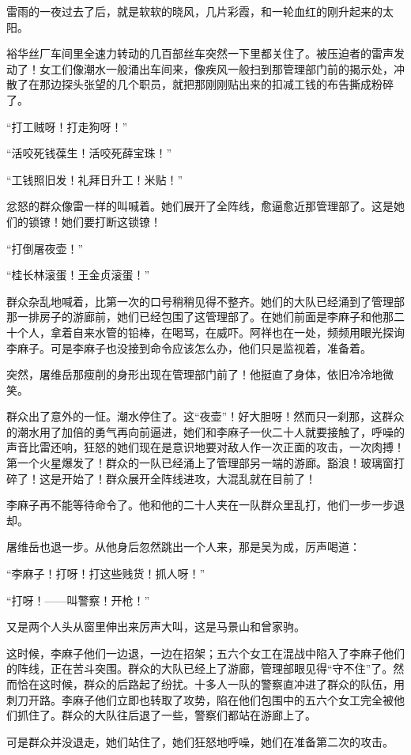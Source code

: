 \par 雷雨的一夜过去了后，就是软软的晓风，几片彩霞，和一轮血红的刚升起来的太阳。
\par 裕华丝厂车间里全速力转动的几百部丝车突然一下里都关住了。被压迫者的雷声发动了！女工们像潮水一般涌出车间来，像疾风一般扫到那管理部门前的揭示处，冲散了在那边探头张望的几个职员，就把那刚刚贴出来的扣减工钱的布告撕成粉碎了。
\par “打工贼呀！打走狗呀！”
\par “活咬死钱葆生！活咬死薛宝珠！”
\par “工钱照旧发！礼拜日升工！米贴！”
\par 忿怒的群众像雷一样的叫喊着。她们展开了全阵线，愈逼愈近那管理部了。这是她们的锁镣！她们要打断这锁镣！
\par “打倒屠夜壶！”
\par “桂长林滚蛋！王金贞滚蛋！”
\par 群众杂乱地喊着，比第一次的口号稍稍见得不整齐。她们的大队已经涌到了管理部那一排房子的游廊前，她们已经包围了这管理部了。在她们前面是李麻子和他那二十个人，拿着自来水管的铅棒，在喝骂，在威吓。阿祥也在一处，频频用眼光探询李麻子。可是李麻子也没接到命令应该怎么办，他们只是监视着，准备着。
\par 突然，屠维岳那瘦削的身形出现在管理部门前了！他挺直了身体，依旧冷冷地微笑。
\par 群众出了意外的一怔。潮水停住了。这“夜壶”！好大胆呀！然而只一刹那，这群众的潮水用了加倍的勇气再向前逼进，她们和李麻子一伙二十人就要接触了，呼噪的声音比雷还响，狂怒的她们现在是意识地要对敌人作一次正面的攻击，一次肉搏！第一个火星爆发了！群众的一队已经涌上了管理部另一端的游廊。豁浪！玻璃窗打碎了！这是开始了！群众展开全阵线进攻，大混乱就在目前了！
\par 李麻子再不能等待命令了。他和他的二十人夹在一队群众里乱打，他们一步一步退却。
\par 屠维岳也退一步。从他身后忽然跳出一个人来，那是吴为成，厉声喝道：
\par “李麻子！打呀！打这些贱货！抓人呀！”
\par “打呀！——叫警察！开枪！”
\par 又是两个人头从窗里伸出来厉声大叫，这是马景山和曾家驹。
\par 这时候，李麻子他们一边退，一边在招架；五六个女工在混战中陷入了李麻子他们的阵线，正在苦斗突围。群众的大队已经上了游廊，管理部眼见得“守不住”了。然而恰在这时候，群众的后路起了纷扰。十多人一队的警察直冲进了群众的队伍，用刺刀开路。李麻子他们立即也转取了攻势，陷在他们包围中的五六个女工完全被他们抓住了。群众的大队往后退了一些，警察们都站在游廊上了。
\par 可是群众并没退走，她们站住了，她们狂怒地呼噪，她们在准备第二次的攻击。
